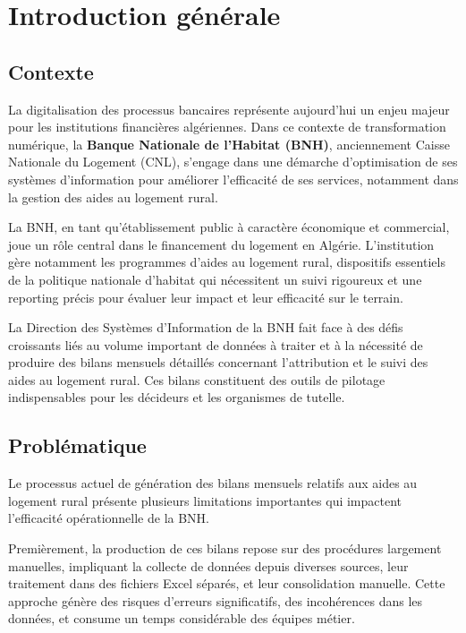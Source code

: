 \chapter*{Introduction générale}
\label{chap:introduction}

\section*{Contexte}

La digitalisation des processus bancaires représente aujourd'hui un enjeu majeur pour les institutions financières algériennes. Dans ce contexte de transformation numérique, la \textbf{Banque Nationale de l'Habitat (BNH)}, anciennement Caisse Nationale du Logement (CNL), s'engage dans une démarche d'optimisation de ses systèmes d'information pour améliorer l'efficacité de ses services, notamment dans la gestion des aides au logement rural.

\medskip

La BNH, en tant qu'établissement public à caractère économique et commercial, joue un rôle central dans le financement du logement en Algérie. L'institution gère notamment les programmes d'aides au logement rural, dispositifs essentiels de la politique nationale d'habitat qui nécessitent un suivi rigoureux et une reporting précis pour évaluer leur impact et leur efficacité sur le terrain.

\medskip

La Direction des Systèmes d'Information de la BNH fait face à des défis croissants liés au volume important de données à traiter et à la nécessité de produire des bilans mensuels détaillés concernant l'attribution et le suivi des aides au logement rural. Ces bilans constituent des outils de pilotage indispensables pour les décideurs et les organismes de tutelle.

\section*{Problématique}

Le processus actuel de génération des bilans mensuels relatifs aux aides au logement rural présente plusieurs limitations importantes qui impactent l'efficacité opérationnelle de la BNH.

\medskip

Premièrement, la production de ces bilans repose sur des procédures largement manuelles, impliquant la collecte de données depuis diverses sources, leur traitement dans des fichiers Excel séparés, et leur consolidation manuelle. Cette approche génère des risques d'erreurs significatifs, des incohérences dans les données, et consume un temps considérable des équipes métier.

